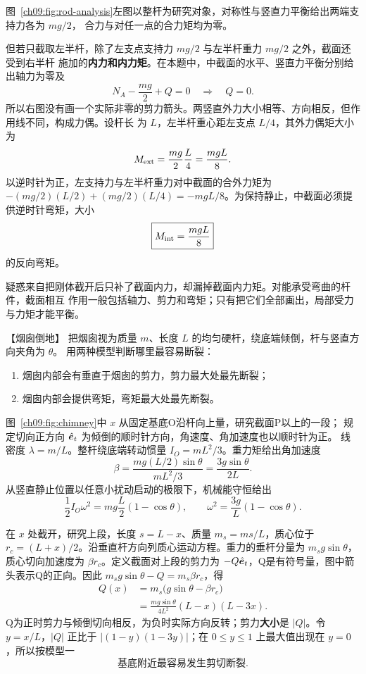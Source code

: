 {\begin{xesolution}
图~\ref{ch09:fig:rod-analysis}左图以整杆为研究对象，对称性与竖直力平衡给出两端支持力各为 $mg/2$，
合力与对任一点的合力矩均为零。
\supportedRodDiagram

但若只截取左半杆，除了左支点支持力 $mg/2$ 与左半杆重力 $mg/2$ 之外，截面还受到右半杆
施加的\textbf{内力和内力矩}。在本题中，中截面的水平、竖直力平衡分别给出轴力为零及
\[
 N_A-\frac{mg}{2}+Q=0\quad\Longrightarrow\quad Q=0.
\]
所以右图没有画一个实际非零的剪力箭头。两竖直外力大小相等、方向相反，但作用线不同，构成力偶。设杆长
为 $L$，左半杆重心距左支点 $L/4$，其外力偶矩大小为
\[
 M_{\rm ext}=\frac{mg}{2}\frac L4=\frac{mgL}{8}.
\]
以逆时针为正，左支持力与左半杆重力对中截面的合外力矩为
$-(mg/2)(L/2)+(mg/2)(L/4)=-mgL/8$。为保持静止，中截面必须提供逆时针弯矩，大小
\[
 \boxed{M_{\rm int}=\frac{mgL}{8}}
\]
的反向弯矩。

疑惑来自把刚体截开后只补了截面内力，却漏掉截面内力矩。对能承受弯曲的杆件，截面相互
作用一般包括轴力、剪力和弯矩；只有把它们全部画出，局部受力与力矩才能平衡。
\end{xesolution}

\begin{origexamplebox}{【烟囱倒地】}\label{ch09:ex:s17-15-11}
把烟囱视为质量 $m$、长度 $L$ 的均匀硬杆，绕底端倾倒，杆与竖直方向夹角为 $\theta$。
用两种模型判断哪里最容易断裂：
\begin{enumerate}[label=(\arabic*),leftmargin=2.2em]
  \item 烟囱内部会有垂直于烟囱的剪力，剪力最大处最先断裂；
  \item 烟囱内部会提供弯矩，弯矩最大处最先断裂。
\end{enumerate}


\ThQChimney
\end{origexamplebox}

\begin{xesolution}
\chimneyDiagram

图~\ref{ch09:fig:chimney}中 $x$ 从固定基底O沿杆向上量，研究截面P以上的一段；
规定切向正方向 $\hat{\bm{e}}_t$ 为倾倒的顺时针方向，角速度、角加速度也以顺时针为正。
线密度 $\lambda=m/L$。整杆绕底端转动惯量
$I_O=mL^2/3$。重力矩给出角加速度
\[
 \beta=\frac{mg(L/2)\sin\theta}{mL^2/3}
 =\frac{3g\sin\theta}{2L}.
\]
从竖直静止位置以任意小扰动启动的极限下，机械能守恒给出
\[
 \frac12I_O\omega^2=mg\frac L2(1-\cos\theta),
 \qquad
 \omega^2=\frac{3g}{L}(1-\cos\theta).
\]

在 $x$ 处截开，研究上段，长度 $s=L-x$、质量 $m_s=ms/L$，质心位于
$r_c=(L+x)/2$。沿垂直杆方向列质心运动方程。重力的垂杆分量为
$m_sg\sin\theta$，质心切向加速度为 $\beta r_c$。定义截面对上段的剪力为
$-Q\hat{\bm{e}}_t$，Q是有符号量，图中箭头表示Q的正向。因此
$m_sg\sin\theta-Q=m_s\beta r_c$，得
\begin{align*}
 Q(x)&=m_s\bigl(g\sin\theta-\beta r_c\bigr)\\
 &=\frac{mg\sin\theta}{4L^2}(L-x)(L-3x).
\end{align*}
Q为正时剪力与倾倒切向相反，为负时实际方向反转；剪力\textbf{大小}是 $|Q|$。令 $y=x/L$，$|Q|$ 正比于
$|(1-y)(1-3y)|$；在 $0\le y\le1$ 上最大值出现在 $y=0$，所以按模型一
\[
 \boxed{\text{基底附近最容易发生剪切断裂}}.
\]


\end{xesolution}}
